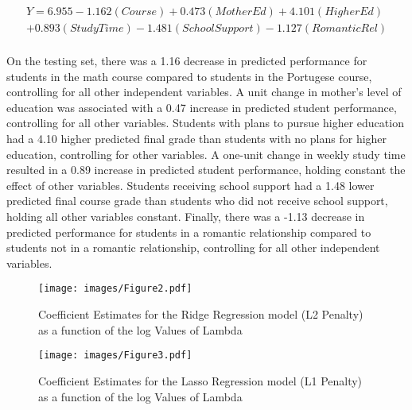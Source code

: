\documentclass[sigconf]{acmart}
\begin{document}
\begin{equation*}
 \begin{aligned}
  Y = 6.955 - 1.162(Course) + 0.473(MotherEd) + 4.101(HigherEd) \\
  +  0.893(StudyTime) - 1.481(SchoolSupport) - 1.127(RomanticRel) \\
 \end{aligned}
\end{equation*}


On the testing set, there was a 1.16 decrease in predicted performance 
for students in the math course compared to students in the Portugese course, 
controlling for all other independent variables. A unit change in mother's 
level of education was associated with a 0.47 increase in predicted student 
performance, controlling for all other variables. Students with plans to pursue
higher education had a 4.10 higher predicted final grade than students with 
no plans for higher education, controlling for other variables. A one-unit 
change in weekly study time resulted in a 0.89 increase in predicted student 
performance, holding constant the effect of other variables. Students receiving 
school support had a 1.48 lower predicted final course grade than students who 
did not receive school support, holding all other variables constant. Finally, 
there was a -1.13 decrease in predicted performance for students in a romantic 
relationship compared to students not in a romantic relationship, controlling
for all other independent variables. 


\begin{figure}[!ht]
  \centering\texttt{[image: images/Figure2.pdf]}
  \caption{Coefficient Estimates for the Ridge Regression model 
  (L2 Penalty) as a function of the log Values of Lambda}
  \label{f:Figure2}
\end{figure}

\begin{figure}[!ht]
  \centering\texttt{[image: images/Figure3.pdf]}
  \caption{Coefficient Estimates for the Lasso Regression model 
  (L1 Penalty) as a function of the log Values of Lambda}
  \label{f:Figure3}
\end{figure}

\end{document}
